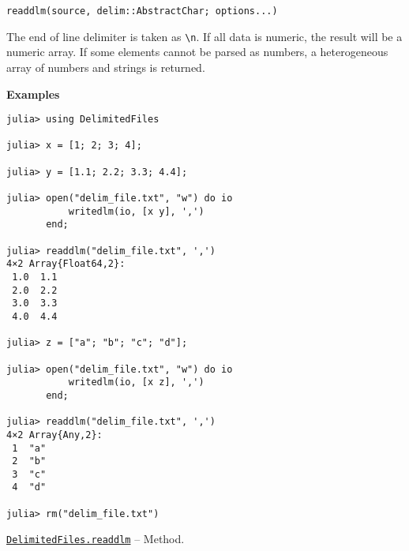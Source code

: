 \begin{adjustwidth}{2em}{0pt}


\begin{verbatim}
readdlm(source, delim::AbstractChar; options...)
\end{verbatim}

The end of line delimiter is taken as \texttt{{\textbackslash}n}. If all data is numeric, the result will be a numeric array. If some elements cannot be parsed as numbers, a heterogeneous array of numbers and strings is returned.

\textbf{Examples}


\begin{verbatim}
julia> using DelimitedFiles

julia> x = [1; 2; 3; 4];

julia> y = [1.1; 2.2; 3.3; 4.4];

julia> open("delim_file.txt", "w") do io
           writedlm(io, [x y], ',')
       end;

julia> readdlm("delim_file.txt", ',')
4×2 Array{Float64,2}:
 1.0  1.1
 2.0  2.2
 3.0  3.3
 4.0  4.4

julia> z = ["a"; "b"; "c"; "d"];

julia> open("delim_file.txt", "w") do io
           writedlm(io, [x z], ',')
       end;

julia> readdlm("delim_file.txt", ',')
4×2 Array{Any,2}:
 1  "a"
 2  "b"
 3  "c"
 4  "d"

julia> rm("delim_file.txt")
\end{verbatim}



\end{adjustwidth}
\hypertarget{2674796801770597595}{} 
\hyperlink{2674796801770597595}{\texttt{DelimitedFiles.readdlm}}  -- {Method.}

